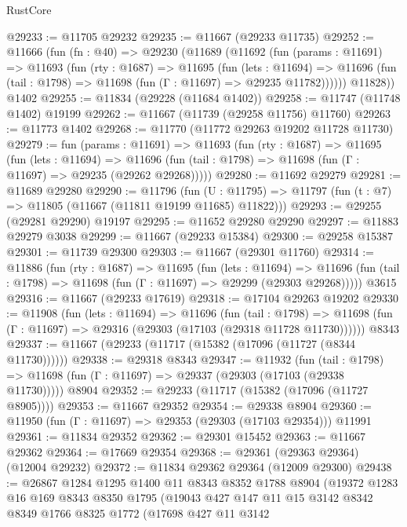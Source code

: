 \begin{lexlean}{RustCore}
\begin{coremodule}
@29233 := @11705 @29232
@29235 := @11667 (@29233 @11735)
@29252 := @11666
    (fun (fn : @40) =>
    @29230
      (@11689
        (@11692
          (fun (params : @11691) =>
          @11693
            (fun (rty : @1687) =>
            @11695
              (fun (lets : @11694) =>
              @11696 (fun (tail : @1798) => @11698 (fun (Γ : @11697) => @29235 @11782))))))
        @11828))
    @1402
@29255 := @11834 (@29228 (@11684 @1402))
@29258 := @11747 (@11748 @1402) @19199
@29262 := @11667 (@11739 (@29258 @11756) @11760)
@29263 := @11773 @1402
@29268 := @11770 (@11772 @29263 @19202 @11728 @11730)
@29279 := fun (params : @11691) =>
  @11693
    (fun (rty : @1687) =>
    @11695
      (fun (lets : @11694) =>
      @11696 (fun (tail : @1798) => @11698 (fun (Γ : @11697) => @29235 (@29262 @29268)))))
@29280 := @11692 @29279
@29281 := @11689 @29280
@29290 := @11796
    (fun (U : @11795) => @11797 (fun (t : @7) => @11805 (@11667 (@11811 @19199 @11685) @11822)))
@29293 := @29255 (@29281 @29290) @19197
@29295 := @11652 @29280 @29290
@29297 := @11883 @29279 @3038
@29299 := @11667 (@29233 @15384)
@29300 := @29258 @15387
@29301 := @11739 @29300
@29303 := @11667 (@29301 @11760)
@29314 := @11886
    (fun (rty : @1687) =>
    @11695
      (fun (lets : @11694) =>
      @11696 (fun (tail : @1798) => @11698 (fun (Γ : @11697) => @29299 (@29303 @29268)))))
    @3615
@29316 := @11667 (@29233 @17619)
@29318 := @17104 @29263 @19202
@29330 := @11908
    (fun (lets : @11694) =>
    @11696
      (fun (tail : @1798) =>
      @11698 (fun (Γ : @11697) => @29316 (@29303 (@17103 (@29318 @11728 @11730))))))
    @8343
@29337 := @11667 (@29233 (@11717 (@15382 (@17096 (@11727 (@8344 @11730))))))
@29338 := @29318 @8343
@29347 := @11932
    (fun (tail : @1798) => @11698 (fun (Γ : @11697) => @29337 (@29303 (@17103 (@29338 @11730)))))
    @8904
@29352 := @29233 (@11717 (@15382 (@17096 (@11727 @8905))))
@29353 := @11667 @29352
@29354 := @29338 @8904
@29360 := @11950 (fun (Γ : @11697) => @29353 (@29303 (@17103 @29354))) @11991
@29361 := @11834 @29352
@29362 := @29301 @15452
@29363 := @11667 @29362
@29364 := @17669 @29354
@29368 := @29361 (@29363 @29364) (@12004 @29232)
@29372 := @11834 @29362 @29364 (@12009 @29300)
@29438 := @26867
    @1284
    @1295
    @1400
    @11
    @8343
    @8352
    @1788
    @8904
    (@19372
      @1283
      @16
      @169
      @8343
      @8350
      @1795
      (@19043
        @427
        @147
        @11
        @15
        @3142
        @8342
        @8349
        @1766
        @8325
        @1772
        (@17698
          @427
          @11
          @3142

\end{coremodule}
\end{lexlean}
